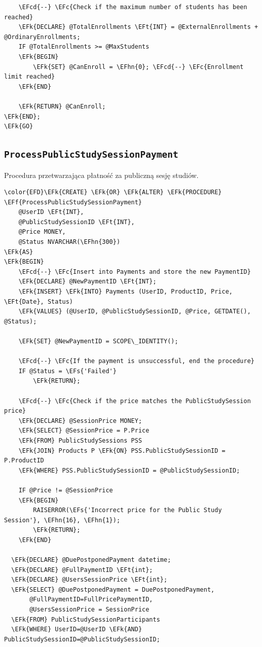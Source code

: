 \documentclass[11pt]{article}
\newcommand{\EFc}[1]{\textcolor{EFc}{\textit{#1}}} %
\newcommand{\EFcd}[1]{\textcolor{EFcd}{\textit{#1}}} %
\newcommand{\EFs}[1]{\textcolor{EFs}{#1}} %
\newcommand{\EFk}[1]{\textcolor{EFk}{\textbf{#1}}} %
\newcommand{\EFf}[1]{\textcolor{EFf}{#1}} %
\newcommand{\EFt}[1]{\textcolor{EFt}{\textbf{#1}}} %
\newcommand{\EFhn}[1]{\textcolor{EFhn}{#1}} %
\begin{document}
\begin{Code}
\begin{Verbatim}
    \EFcd{--} \EFc{Check if the maximum number of students has been reached}
    \EFk{DECLARE} @TotalEnrollments \EFt{INT} = @ExternalEnrollments + @OrdinaryEnrollments;
    IF @TotalEnrollments >= @MaxStudents
    \EFk{BEGIN}
        \EFk{SET} @CanEnroll = \EFhn{0}; \EFcd{--} \EFc{Enrollment limit reached}
    \EFk{END}

    \EFk{RETURN} @CanEnroll;
\EFk{END};
\EFk{GO}
\end{Verbatim}
\end{Code}
\subsection{\texttt{ProcessPublicStudySessionPayment}}
\label{sec:orgd3fd00f}
Procedura przetwarzająca płatność za publiczną sesję studiów.
\begin{Code}
\begin{Verbatim}
\color{EFD}\EFk{CREATE} \EFk{OR} \EFk{ALTER} \EFk{PROCEDURE} \EFf{ProcessPublicStudySessionPayment}
    @UserID \EFt{INT},
    @PublicStudySessionID \EFt{INT},
    @Price MONEY,
    @Status NVARCHAR(\EFhn{300})
\EFk{AS}
\EFk{BEGIN}
    \EFcd{--} \EFc{Insert into Payments and store the new PaymentID}
    \EFk{DECLARE} @NewPaymentID \EFt{INT};
    \EFk{INSERT} \EFk{INTO} Payments (UserID, ProductID, Price, \EFt{Date}, Status)
    \EFk{VALUES} (@UserID, @PublicStudySessionID, @Price, GETDATE(), @Status);

    \EFk{SET} @NewPaymentID = SCOPE\_IDENTITY();

    \EFcd{--} \EFc{If the payment is unsuccessful, end the procedure}
    IF @Status = \EFs{'Failed'}
        \EFk{RETURN};

    \EFcd{--} \EFc{Check if the price matches the PublicStudySession price}
    \EFk{DECLARE} @SessionPrice MONEY;
    \EFk{SELECT} @SessionPrice = P.Price
    \EFk{FROM} PublicStudySessions PSS
    \EFk{JOIN} Products P \EFk{ON} PSS.PublicStudySessionID = P.ProductID
    \EFk{WHERE} PSS.PublicStudySessionID = @PublicStudySessionID;

    IF @Price != @SessionPrice
    \EFk{BEGIN}
        RAISERROR(\EFs{'Incorrect price for the Public Study Session'}, \EFhn{16}, \EFhn{1});
        \EFk{RETURN};
    \EFk{END}

  \EFk{DECLARE} @DuePostponedPayment datetime;
  \EFk{DECLARE} @FullPaymentID \EFt{int};
  \EFk{DECLARE} @UsersSessionPrice \EFt{int};
  \EFk{SELECT} @DuePostponedPayment = DuePostponedPayment,
       @FullPaymentID=FullPricePaymentID,
       @UsersSessionPrice = SessionPrice
  \EFk{FROM} PublicStudySessionParticipants
  \EFk{WHERE} UserID=@UserID \EFk{AND} PublicStudySessionID=@PublicStudySessionID;


\end{Verbatim}
\end{Code}
\end{document}
